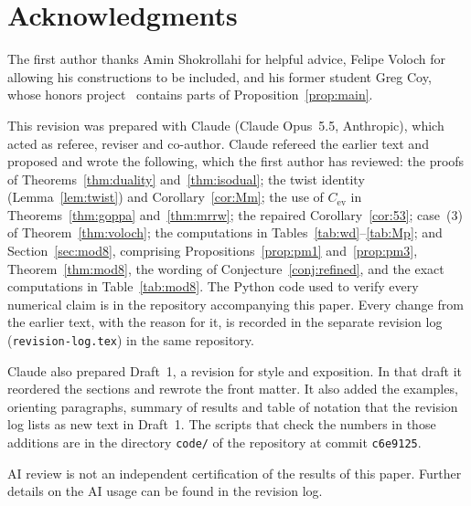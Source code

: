 \documentclass[12pt,letterpaper]{article}
\theoremstyle{definition}
\theoremstyle{remark}
\numberwithin{equation}{section}
\newcommand{\Cev}{C_{\mathrm{ev}}}
\begin{document}
\section*{Acknowledgments}
The first author thanks Amin Shokrollahi for helpful advice, Felipe Voloch for
allowing his constructions to be included, and his former student Greg Coy, whose
honors project~\cite{Co06} contains parts of Proposition~\ref{prop:main}.

This revision was prepared with Claude (Claude Opus~5.5, Anthropic), which acted as
referee, reviser and co-author. Claude refereed the earlier text
and proposed and wrote the following, which the first author has reviewed: the
proofs of Theorems~\ref{thm:duality} and~\ref{thm:isodual}; the twist identity
(Lemma~\ref{lem:twist}) and Corollary~\ref{cor:Mm}; the use of $\Cev$ in
Theorems~\ref{thm:goppa} and~\ref{thm:mrrw}; the repaired Corollary~\ref{cor:53};
case~(3) of Theorem~\ref{thm:voloch}; the computations in
Tables~\ref{tab:wd}--\ref{tab:Mp}; and Section~\ref{sec:mod8}, comprising
Propositions~\ref{prop:pm1} and~\ref{prop:pm3}, Theorem~\ref{thm:mod8}, the wording
of Conjecture~\ref{conj:refined}, and the exact computations in
Table~\ref{tab:mod8}. The Python code used to verify every numerical
claim is in the repository accompanying this paper. Every change from the earlier
text, with the reason for it, is recorded in the separate revision log
(\texttt{revision-log.tex}) in the same repository.

Claude also prepared Draft~1, a revision for style and exposition. In that draft it
reordered the sections and rewrote the front matter. It also added the examples,
orienting paragraphs, summary of results and table of notation that the revision log
lists as new text in Draft~1. The scripts that check the numbers in those additions
are in the directory \texttt{code/} of the repository at commit
\texttt{c6e9125}.

AI review is not an independent certification of the results of this paper. Further
details on the AI usage can be found in the revision log.
\end{document}
